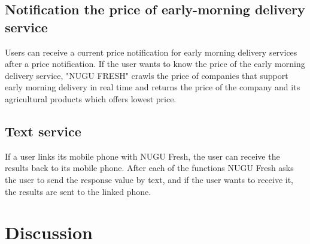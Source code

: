 \documentclass[conference]{IEEEtran}
\begin{document}
\subsection{Notification the price of early-morning delivery service}
Users can receive a current price notification for early morning delivery services after a price notification. If the user wants to know the price of the early morning delivery service, "NUGU FRESH" crawls the price of companies that support early morning delivery in real time and returns the price of the company and its agricultural products which offers lowest price.

\subsection{Text service}
If a user links its mobile phone with NUGU Fresh, the user can receive the results back to its mobile phone. After each of the functions NUGU Fresh asks the user to send the response value by text, and if the user wants to receive it, the results are sent to the linked phone.

\section{Discussion}
\end{document}
